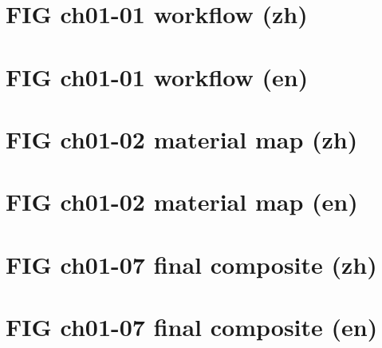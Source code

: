 \documentclass[UTF8,a4paper]{ctexart}
\begin{document}
\section*{FIG ch01-01 workflow (zh)}

\newpage
\section*{FIG ch01-01 workflow (en)}

\newpage
\section*{FIG ch01-02 material map (zh)}

\newpage
\section*{FIG ch01-02 material map (en)}

\newpage
\section*{FIG ch01-07 final composite (zh)}

\newpage
\section*{FIG ch01-07 final composite (en)}

\end{document}
